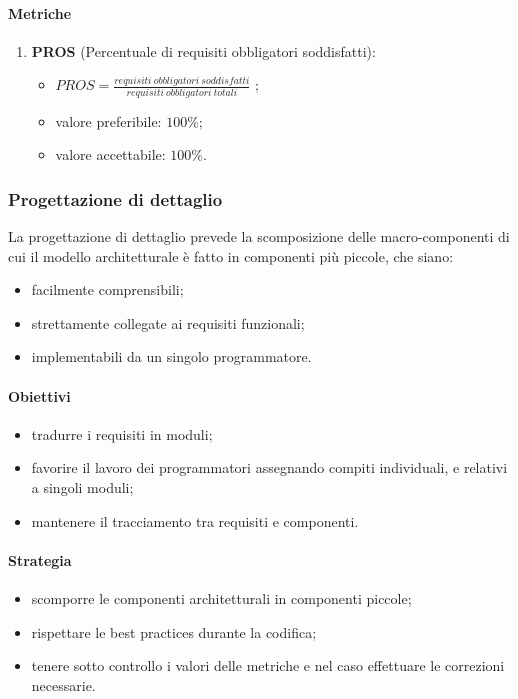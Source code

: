        \paragraph{Metriche}
            \begin{enumerate}
                \item \textbf{PROS} (Percentuale di requisiti obbligatori soddisfatti):
                \begin{itemize}
                    \item $PROS = \frac{requisiti\ obbligatori\ soddisfatti}{requisiti\ obbligatori\ totali}$ ;
                    \item valore preferibile: $100\%$;
                    \item valore accettabile: $100\%$.
                \end{itemize}
            \end{enumerate}
    \subsubsection{Progettazione di dettaglio}
        La progettazione di dettaglio prevede la scomposizione delle macro-componenti di cui il modello architetturale è fatto in componenti più piccole, che siano:
        \begin{itemize}
            \item facilmente comprensibili;
            \item strettamente collegate ai requisiti funzionali;
            \item implementabili da un singolo programmatore.
        \end{itemize}
        \paragraph{Obiettivi}
            \begin{itemize}
                \item tradurre i requisiti in moduli;
                \item favorire il lavoro dei programmatori assegnando compiti individuali, e relativi a singoli moduli;
                \item mantenere il tracciamento tra requisiti e componenti.
            \end{itemize}
        \paragraph{Strategia}
            \begin{itemize}
                \item scomporre le componenti architetturali in componenti piccole;
                \item rispettare le best practices durante la codifica;
                \item tenere sotto controllo i valori delle metriche e nel caso effettuare le correzioni necessarie.
            \end{itemize}
